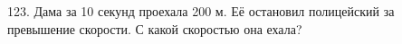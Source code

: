 123. Дама за 10 секунд проехала 200 м. Её остановил полицейский за превышение скорости. С какой скоростью она ехала?\\
